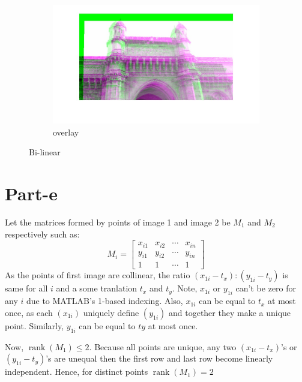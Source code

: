 \documentclass[a4paper]{article}
\begin{document}
\begin{figure}[H]
\begin{subfigure}{.4\textwidth}
\end{subfigure}
\begin{subfigure}{.4\textwidth}
  \centering
  \includegraphics[width=.8\linewidth]{ob.jpg}  
  \caption{overlay}
  
\end{subfigure}
\caption{Bi-linear}

\end{figure}
\section{Part-e} %
\label{sec:part_e}

Let the matrices formed by points of image 1 and image 2 be $M_1$ and $M_2$ respectively such as:
\begin{equation}
	M_i =
	\begin{bmatrix}
		x_{i1} & x_{i2} & \cdots & x_{in}\\
		y_{i1} & y_{i2} & \cdots & y_{in}\\
		1 & 1 & \cdots & 1
	\end{bmatrix}
\end{equation}
As the points of first image are collinear, the ratio $(x_{1i}-t_x):(y_{1i}-t_y)$ is same for all $i$ and a some tranlation $t_x$ and $t_y$. Note, $x_{1i}$ or $y_{1i}$ can't be zero for any $i$ due to MATLAB's 1-based indexing. Also, $x_{1i}$ can be equal to $t_x$ at most once, as each $(x_{1i})$ uniquely define $(y_{1i})$ and together they make a unique point. Similarly, $y_{1i}$ can be equal to $ty$ at most once.

Now, $\operatorname{rank}(M_1)\leq 2$. Because all points are unique, any two $(x_{1i}-t_x)$'s or $(y_{1i}-t_y)$'s are unequal then the first row and last row become linearly independent. Hence, for distinct points $\operatorname{rank}(M_1)=2$ 
\end{document}
